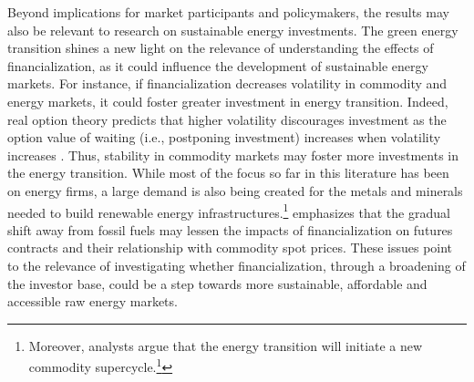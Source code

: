 \documentclass[12pt]{article}
\begin{document}
Beyond implications for market participants and policymakers, the results may also be relevant to research on sustainable energy investments. The green energy transition shines a new light on the relevance of understanding the effects of financialization, as it could influence the development of sustainable energy markets. For instance, if financialization decreases volatility in commodity and energy markets, it could foster greater investment in energy transition. Indeed, real option theory predicts that higher volatility discourages investment as the option value of waiting (i.e., postponing investment) increases when volatility increases \citep*{kellogg2014effect}.  Thus, stability in commodity markets may foster more investments in the energy  transition. While most of the focus so far in this literature has been on energy firms, a large demand is also being created for the metals and minerals needed to build renewable energy infrastructures.\footnote{Moreover, analysts argue that the energy transition will initiate a new commodity supercycle.\footnote{See e.g., J.P. Morgan Asset Management, ``A new supercycle – the clean tech transition and implications for global commodities,'' February 24th, 2022. \url{https://am.jpmorgan.com/lu/en/asset-management/per/insights/market-insights/market-updates/on-the-minds-of-investors/clean-energy-investment/}}} \citet*{knuth2018breakthroughs} emphasizes that the gradual shift away from fossil fuels may lessen the impacts of financialization on futures contracts and their relationship with commodity spot prices. These issues point to the relevance of investigating whether financialization, through a broadening of the investor base, could be a step towards more sustainable, affordable and accessible raw energy markets.






\end{document}
